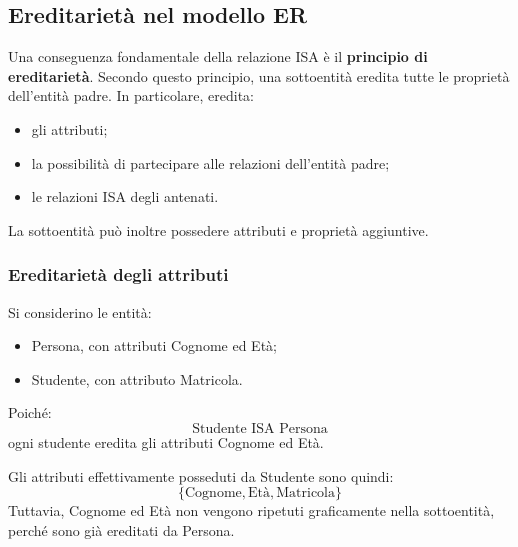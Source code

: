 
\subsection{Ereditarietà nel modello ER}

Una conseguenza fondamentale della relazione ISA
è il \textbf{principio di ereditarietà}.
Secondo questo principio, una sottoentità
eredita tutte le proprietà dell'entità padre.
In particolare, eredita:

\begin{itemize}
    \item gli attributi;
    \item la possibilità di partecipare
    alle relazioni dell'entità padre;
    \item le relazioni ISA degli antenati.
\end{itemize}
\noindent
La sottoentità può inoltre possedere
attributi e proprietà aggiuntive.

\subsubsection*{Ereditarietà degli attributi}

Si considerino le entità:

\begin{itemize}
    \item Persona, con attributi Cognome ed Età;
    \item Studente, con attributo Matricola.
\end{itemize}
\noindent
Poiché:
\[
\text{Studente ISA Persona}
\]
ogni studente eredita gli attributi
Cognome ed Età.
\begin{center}
\end{center}
\noindent
Gli attributi effettivamente posseduti
da Studente sono quindi:
\[
\{
\text{Cognome},
\text{Età},
\text{Matricola}
\}
\]
Tuttavia, Cognome ed Età non vengono
ripetuti graficamente nella sottoentità,
perché sono già ereditati da Persona.

